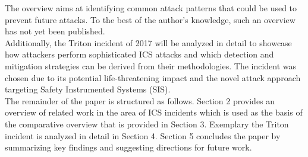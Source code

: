 \documentclass[runningheads]{llncs}
\begin{document}
The overview aims at identifying common attack patterns that could be used to prevent future attacks.
To the best of the author's knowledge, such an overview has not yet been published.\\
Additionally, the Triton incident of 2017 will be analyzed in detail to showcase how attackers perform sophisticated ICS attacks and which detection and mitigation strategies can be derived from their methodologies.
The incident was chosen due to its potential life-threatening impact and the novel attack approach targeting Safety Instrumented Systems (SIS).\\
The remainder of the paper is structured as follows.
Section 2 provides an overview of related work in the area of ICS incidents which is used as the basis of the comparative overview that is provided in Section 3.
Exemplary the Triton incident is analyzed in detail in Section 4.
Section 5 concludes the paper by summarizing key findings and suggesting directions for future work.
\end{document}
